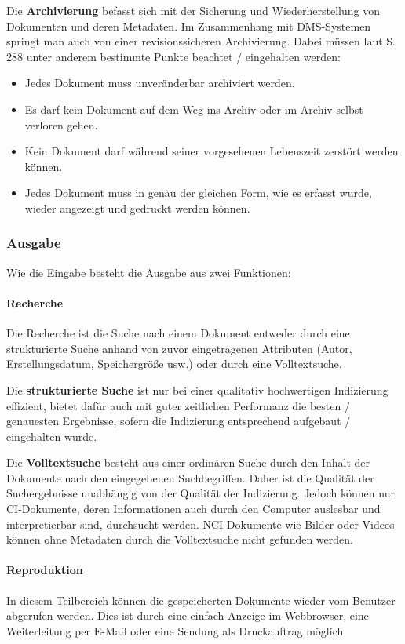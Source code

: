 Die \textbf{Archivierung} befasst sich mit der Sicherung und Wiederherstellung von Dokumenten und deren Metadaten.
Im Zusammenhang mit DMS-Systemen springt man auch von einer revisionssicheren Archivierung.
Dabei müssen laut \cite{DMS08} S. 288 unter anderem bestimmte Punkte beachtet / eingehalten werden:

\begin{itemize}
\item Jedes Dokument muss unveränderbar archiviert werden.
\item Es darf kein Dokument auf dem Weg ins Archiv oder im Archiv selbst verloren gehen.
\item Kein Dokument darf während seiner vorgesehenen Lebenszeit zerstört werden können.
\item Jedes Dokument muss in genau der gleichen Form, wie es erfasst wurde, wieder angezeigt und gedruckt werden können.
\end{itemize}

\subsubsection{Ausgabe}
Wie die Eingabe besteht die Ausgabe aus zwei Funktionen:

\paragraph{Recherche}
Die Recherche ist die Suche nach einem Dokument entweder durch eine strukturierte Suche anhand von zuvor eingetragenen Attributen (Autor, Erstellungsdatum, Speichergröße usw.) oder durch eine Volltextsuche.

Die \textbf{strukturierte Suche} ist nur bei einer qualitativ hochwertigen Indizierung effizient, bietet dafür auch mit guter zeitlichen Performanz die besten / genauesten Ergebnisse, sofern die Indizierung entsprechend aufgebaut / eingehalten wurde.

Die \textbf{Volltextsuche} besteht aus einer ordinären Suche durch den Inhalt der Dokumente nach den eingegebenen Suchbegriffen.
Daher ist die Qualität der Suchergebnisse unabhängig von der Qualität der Indizierung.
Jedoch können nur \gls{CI}-Dokumente, deren Informationen auch durch den Computer auslesbar und interpretierbar sind, durchsucht werden.
\gls{NCI}-Dokumente wie Bilder oder Videos können ohne Metadaten durch die Volltextsuche nicht gefunden werden.

\paragraph{Reproduktion}
In diesem Teilbereich können die gespeicherten Dokumente wieder vom Benutzer abgerufen werden.
Dies ist durch eine einfach Anzeige im Webbrowser, eine Weiterleitung per E-Mail oder eine Sendung als Druckauftrag möglich.



